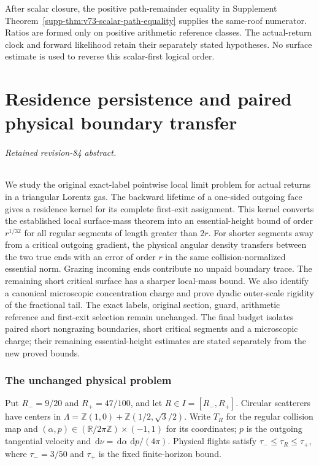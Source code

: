 \documentclass[11pt,reqno]{amsart}
\numberwithin{equation}{section}
\theoremstyle{definition}\newtheorem{definition}[theorem]{Definition}
\theoremstyle{remark}\newtheorem{remark}[theorem]{Remark}
\newcommand{\R}{\mathbb R}\newcommand{\Z}{\mathbb Z}\newcommand{\T}{\mathbb T}
\newcommand{\dd}{\,\mathrm d}\newcommand{\one}{\mathbf1}
\theoremstyle{definition}\newtheorem{inputstatement}[theorem]{Input statement}
\begin{document}
After scalar closure, the positive path-remainder equality in
Supplement Theorem~\ref{supp-thm:v73-scalar-path-equality} supplies
the same-roof numerator. Ratios are formed only on positive arithmetic
reference classes. The actual-return clock and forward likelihood
retain their separately stated hypotheses. No surface estimate is
used to reverse this scalar-first logical order.

\appendix


\endgroup
\part{Residence persistence and paired physical boundary transfer}
\begingroup
\let\ArchiveLabel\label
\let\ArchiveRef\ref
\renewcommand{\label}[1]{\ArchiveLabel{v84archive:#1}}
\renewcommand{\ref}[1]{%
  \IfBeginWith{#1}{supp-}{%
    \StrBehind{#1}{supp-}[\ArchiveTarget]%
    \ArchiveRef{\ArchiveTarget}%
  }{\ArchiveRef{v84archive:#1}}%
}
\makeatletter
\let\ltx@label\label
\makeatother
\paragraph{Retained revision-84 abstract.}

We study the original exact-label pointwise local limit problem for
actual returns in a triangular Lorentz gas. The backward lifetime of
a one-sided outgoing face gives a residence kernel for its complete
first-exit assignment. This kernel converts the established local
surface-mass theorem into an essential-height bound of order
$r^{1/32}$ for all regular segments of length greater than $2r$.
For shorter segments away from a critical outgoing gradient, the
physical angular density transfers between the two true ends with
an error of order $r$ in the same collision-normalized essential norm.
Grazing incoming ends contribute no unpaid boundary trace. The
remaining short critical surface has a sharper local-mass bound.
We also identify a canonical microscopic concentration charge and
prove dyadic outer-scale rigidity of the fractional tail. The exact
labels, original section, guard, arithmetic reference and first-exit
selection remain unchanged. The final budget isolates paired short
nongrazing boundaries, short critical segments and a microscopic
charge; their remaining essential-height estimates are stated
separately from the new proved bounds.



\section{The unchanged physical problem}
Put $R_-=9/20$ and $R_+=47/100$, and let $R\in I=[R_-,R_+]$. Circular scatterers have centers in
$\Lambda=\Z(1,0)+\Z(1/2,\sqrt3/2)$. Write $T_R$ for the regular
collision map and $(\alpha,p)\in(\R/2\pi\Z)\times(-1,1)$ for its
coordinates; $p$ is the outgoing tangential velocity and
$\dd\nu=\dd\alpha\,\dd p/(4\pi)$. Physical flights satisfy
$\tau_-\le\tau_R\le\tau_+$, where $\tau_-=3/50$ and $\tau_+$
is the fixed finite-horizon bound.
\end{document}
